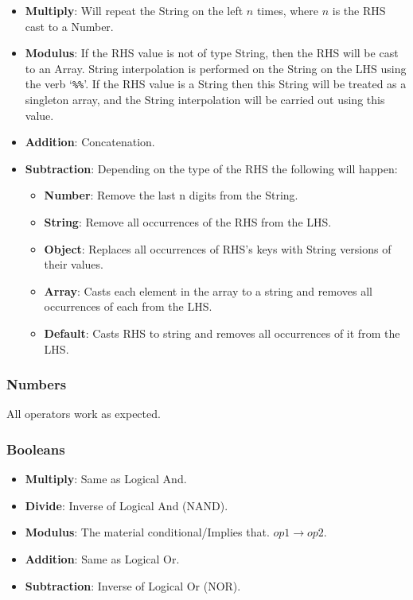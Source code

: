 \begin{itemize}
    \item \textbf{Multiply}: Will repeat the String on the left $n$ times, where $n$ is the RHS cast to a Number.
    \item \textbf{Modulus}: If the RHS value is not of type String, then the RHS will be cast to an Array. String interpolation is performed on the String on the LHS using the verb `\verb|%%|'. If the RHS value is a String then this String will be treated as a singleton array, and the String interpolation will be carried out using this value.
    \item \textbf{Addition}: Concatenation.
    \item \textbf{Subtraction}: Depending on the type of the RHS the following will happen:
    \begin{itemize}
        \item \textbf{Number}:  Remove the last n digits from the String.
        \item \textbf{String}:  Remove all occurrences of the RHS from the LHS.
        \item \textbf{Object}:  Replaces all occurrences of RHS's keys with String versions of their values.
        \item \textbf{Array}:   Casts each element in the array to a string and removes all occurrences of each from the LHS.
        \item \textbf{Default}: Casts RHS to string and removes all occurrences of it from the LHS.
    \end{itemize}
\end{itemize}

\subsubsection{Numbers}

All operators work as expected.

\subsubsection{Booleans}

\begin{itemize}
    \item \textbf{Multiply}: Same as Logical And.
    \item \textbf{Divide}: Inverse of Logical And (NAND).
    \item \textbf{Modulus}: The material conditional/Implies that. $op1 \rightarrow op2$.
    \item \textbf{Addition}: Same as Logical Or.
    \item \textbf{Subtraction}: Inverse of Logical Or (NOR).
\end{itemize}

